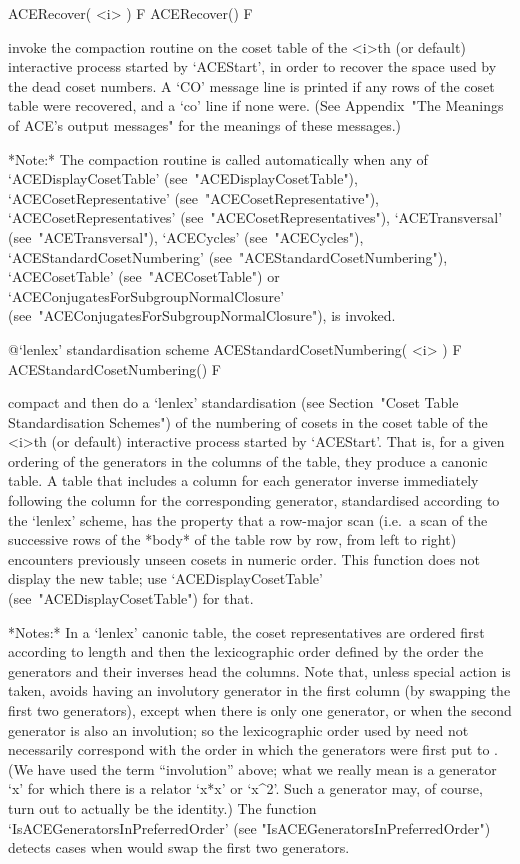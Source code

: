 \>ACERecover( <i> ) F
\>ACERecover() F

invoke the compaction routine on the coset  table  of  the  <i>th  (or
default) interactive {\ACE} process started by `ACEStart', in order to
recover the space used by the dead coset numbers. A `CO' message  line
is printed if any rows of the coset table were recovered, and  a  `co'
line if  none  were.  (See  Appendix~"The  Meanings  of  ACE's  output
messages" for the meanings of these messages.)

*Note:*
The  compaction  routine  is  called   automatically   when   any   of
`ACEDisplayCosetTable'                   (see~"ACEDisplayCosetTable"),
`ACECosetRepresentative'               (see~"ACECosetRepresentative"),
`ACECosetRepresentatives'             (see~"ACECosetRepresentatives"),
`ACETransversal'          (see~"ACETransversal"),          `ACECycles'
(see~"ACECycles"),                         `ACEStandardCosetNumbering'
(see~"ACEStandardCosetNumbering"),                     `ACECosetTable'
(see~"ACECosetTable")    or    `ACEConjugatesForSubgroupNormalClosure'
(see~"ACEConjugatesForSubgroupNormalClosure"), is invoked.

%
{@\noexpand`lenlex' standardisation scheme}
\>ACEStandardCosetNumbering( <i> ) F
\>ACEStandardCosetNumbering() F

compact and then do a  `lenlex'  standardisation  (see  Section~"Coset
Table Standardisation Schemes") of the  numbering  of  cosets  in  the
coset table of the  <i>th  (or  default)  interactive  {\ACE}  process
started by `ACEStart'. That is, for a given ordering of the generators
in the columns of the table, they produce a  canonic  table.  A  table
that  includes  a  column  for  each  generator  inverse   immediately
following the column for  the  corresponding  generator,  standardised
according to the `lenlex' scheme, has the property  that  a  row-major
scan (i.e.~a scan of the successive rows of the *body*  of  the  table
row by row, from left to right) encounters previously unseen cosets in
numeric order. This function does  not  display  the  new  table;  use
`ACEDisplayCosetTable' (see~"ACEDisplayCosetTable") for that.

*Notes:*
In a `lenlex' canonic table, the  coset  representatives  are  ordered
first according to length and then the lexicographic order defined  by
the order the generators and their inverses  head  the  columns.  Note
that,  unless  special  action  is  taken,  {\ACE}  avoids  having  an
involutory generator in the first column (by swapping  the  first  two
generators), except when there is only  one  generator,  or  when  the
second generator is also an involution;  so  the  lexicographic  order
used by {\ACE} need not necessarily correspond with the order in which
the generators were first put  to  {\ACE}.  (We  have  used  the  term
``involution'' above; what we really mean is  a  generator  `x'  for
which there is a relator `x*x' or `x^2'.  Such  a  generator  may,  of
course,  turn  out  to  actually  be  the  identity.)   The   function
`IsACEGeneratorsInPreferredOrder'                                 (see
"IsACEGeneratorsInPreferredOrder") detects  cases  when  {\ACE}  would
swap the first two generators.

